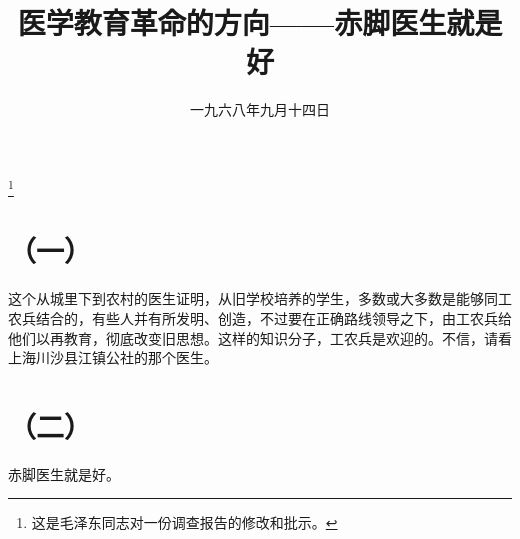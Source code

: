 
\title{医学教育革命的方向——赤脚医生就是好}
\date{一九六八年九月十四日}
\thanks{这是毛泽东同志对一份调查报告的修改和批示。}
\maketitle


\section*{（一）}

这个从城里下到农村的医生证明，从旧学校培养的学生，多数或大多数是能够同工农兵结合的，有些人并有所发明、创造，不过要在正确路线领导之下，由工农兵给他们以再教育，彻底改变旧思想。这样的知识分子，工农兵是欢迎的。不信，请看上海川沙县江镇公社的那个医生。

\section*{（二）}

赤脚医生就是好。

